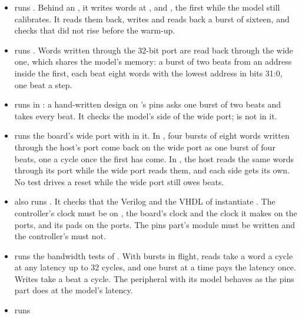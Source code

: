 \begin{itemize}
\item {} runs .
Behind an , it writes words at ,
 and , the first while the model
still calibrates. It reads them back, writes and reads back a burst of
sixteen, and checks that  did not rise before the
warm-up.
\item {} runs
. Words written
through the 32-bit port are read back through the wide one, which
shares the model's memory: a burst of two beats from an address inside
the first, each beat eight words with the lowest address in bits
31:0, one beat a step.
\item {} runs 
in : a hand-written design on 's
pins asks one burst of two beats and takes every beat. It checks the
model's side of the wide port;  is not in it.
\item {} runs the board's wide port with
 in it. In \allowbreak
{}, four bursts of eight words written through the
host's port come back on the wide port as one burst of four beats, one
a cycle once the first has come. In
\allowbreak
{}, the host reads the same words through
its port while the wide port reads them, and each side gets its own.
No test drives a reset while the wide port still owes beats.
\item {} also runs
. It checks
that the Verilog and the VHDL of  instantiate
. The controller's clock must be on , the
board's clock and the clock it makes on the ports, and its pads on
the ports. The pins part's module must be written and the
controller's must not.
\item {} runs the bandwidth tests of
. With bursts in flight, reads take a word a cycle at
any latency up to 32 cycles, and one burst at a time pays the latency
once. Writes take a beat a cycle. The peripheral with its model
behaves as the pins part does at the model's latency.
\item {} runs

\end{itemize}

